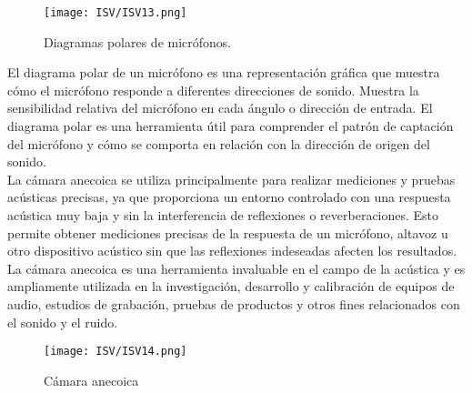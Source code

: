 \documentclass[
	12pt, %
	fleqn, %
	a4paper, %
	oneside, %
]{LegrandOrangeBook}
\begin{document}
\begin{figure}[H]
\centering
\texttt{[image: ISV/ISV13.png]}
\caption{Diagramas polares de micrófonos.}
\end{figure}
El diagrama polar de un micrófono es una representación gráfica que muestra cómo el micrófono responde a diferentes direcciones de sonido. Muestra la sensibilidad relativa del micrófono en cada ángulo o dirección de entrada. El diagrama polar es una herramienta útil para comprender el patrón de captación del micrófono y cómo se comporta en relación con la dirección de origen del sonido.\\
La cámara anecoica se utiliza principalmente para realizar mediciones y pruebas acústicas precisas, ya que proporciona un entorno controlado con una respuesta acústica muy baja y sin la interferencia de reflexiones o reverberaciones. Esto permite obtener mediciones precisas de la respuesta de un micrófono, altavoz u otro dispositivo acústico sin que las reflexiones indeseadas afecten los resultados. La cámara anecoica es una herramienta invaluable en el campo de la acústica y es ampliamente utilizada en la investigación, desarrollo y calibración de equipos de audio, estudios de grabación, pruebas de productos y otros fines relacionados con el sonido y el ruido.
\begin{figure}[H]
\centering
\texttt{[image: ISV/ISV14.png]}
\caption{Cámara anecoica}
\end{figure}
\end{document}
